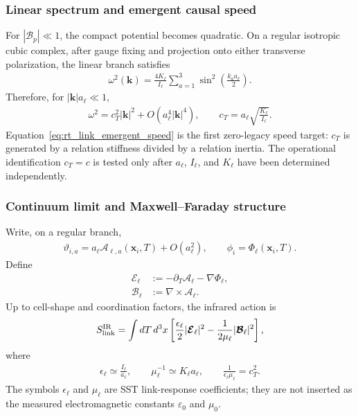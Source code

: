 \subsubsection{Linear spectrum and emergent causal speed}

For $|\mathscr B_p|\ll1$, the compact potential becomes quadratic.  On a
regular isotropic cubic complex, after gauge fixing and projection onto either
transverse polarization, the linear branch satisfies
\begin{align}
    \omega^2(\mathbf k)
    =
    \frac{4K_\ell}{I_\ell}
    \sum_{a=1}^{3}
    \sin^2\!\left(\frac{k_a a_\ell}{2}\right).
    \label{eq:rt_link_lattice_dispersion}
\end{align}
Therefore, for $|\mathbf k|a_\ell\ll1$,
\begin{align}
    \omega^2
    =
    c_T^2|\mathbf k|^2
    +O\!\left(a_\ell^4|\mathbf k|^4\right),
    \qquad
    \boxed{
    c_T=a_\ell\sqrt{\frac{K_\ell}{I_\ell}}
    }.
    \label{eq:rt_link_emergent_speed}
\end{align}
Equation~\eqref{eq:rt_link_emergent_speed} is the first zero-legacy speed target:
$c_T$ is generated by a relation stiffness divided by a relation inertia.  The
operational identification $c_T=c$ is tested only after $a_\ell$, $I_\ell$, and
$K_\ell$ have been determined independently.

\subsubsection{Continuum limit and Maxwell--Faraday structure}

Write, on a regular branch,
\begin{align}
    \vartheta_{i,a}
    =
    a_\ell\mathcal A_{\ell,a}(\mathbf x_i,T)
    +O(a_\ell^2),
    \qquad
    \phi_i=\Phi_\ell(\mathbf x_i,T).
\end{align}
Define
\begin{align}
    \boldsymbol{\mathcal E}_\ell
    &:=-\partial_T\boldsymbol{\mathcal A}_\ell-\nabla\Phi_\ell,
    \\
    \boldsymbol{\mathcal B}_\ell
    &:=\nabla\times\boldsymbol{\mathcal A}_\ell.
    \label{eq:rt_link_continuum_fields}
\end{align}
Up to cell-shape and coordination factors, the infrared action is
\begin{align}
    S_{\rm link}^{\rm IR}
    =
    \int dT\,d^3x
    \left[
        \frac{\epsilon_\ell}{2}
        |\boldsymbol{\mathcal E}_\ell|^2
        -
        \frac{1}{2\mu_\ell}
        |\boldsymbol{\mathcal B}_\ell|^2
    \right],
    \label{eq:rt_link_continuum_action}
\end{align}
where
\begin{align}
    \epsilon_\ell
    \simeq
    \frac{I_\ell}{a_\ell},
    \qquad
    \mu_\ell^{-1}
    \simeq
    K_\ell a_\ell,
    \qquad
    \frac{1}{\epsilon_\ell\mu_\ell}
    =c_T^2.
    \label{eq:rt_link_continuum_coefficients}
\end{align}
The symbols $\epsilon_\ell$ and $\mu_\ell$ are SST link-response coefficients;
they are not inserted as the measured electromagnetic constants
$\varepsilon_0$ and $\mu_0$.

